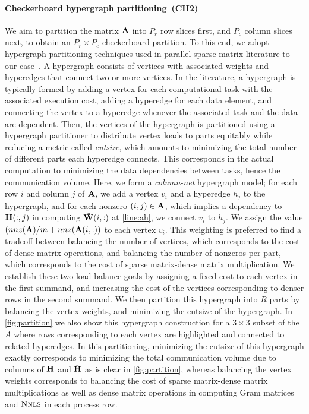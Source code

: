 \paragraph{Checkerboard hypergraph partitioning~(\textbf{CH2})} We aim to partition the matrix $\mathbf{A}$ into $P_r$ row slices first, and $P_c$ column slices next, to obtain an $P_r \times P_c$ checkerboard partition.
To this end, we adopt hypergraph partitioning techniques used in parallel sparse matrix literature to our case~\cite{caay:99}.
A hypergraph consists of vertices with associated weights and hyperedges that connect two or more vertices.
In the literature, a hypergraph is typically formed by adding a vertex for each computational task with the associated execution cost, adding a hyperedge for each data element, and connecting the vertex to a hyperedge whenever the associated task and the data are dependent.
Then, the vertices of the hypergraph is partitioned using a hypergraph partitioner to distribute vertex loads to parts equitably while reducing a metric called \emph{cutsize}, which amounts to minimizing the total number of different parts each hyperedge connects.
This corresponds in the actual computation to minimizing the data dependencies between tasks, hence the communication volume.
Here, we form a \emph{column-net} hypergraph model; for each row $i$ and column $j$ of  $\mathbf{A}$, we add a vertex $v_i$ and a hyperedge $h_j$ to the hypergraph, and for each nonzero $(i, j) \in \mathbf{A}$, which implies a dependency to $\mathbf{H}(:, j)$ in computing $\mathbf{\tilde{W}}(i, :)$ at \cref{line:ah}, we connect $v_i$ to $h_j$.
We assign the value $(nnz(\mathbf{A}) / m + nnz(\mathbf{A}(i, :))$ to each vertex $v_i$.
This weighting is preferred to find a tradeoff between balancing the number of vertices, which corresponds to the cost of dense matrix operations, and balancing the number of nonzeros per part, which corresponds to the cost of sparse matrix-dense matrix multiplication.
We establish these two load balance goals by assigning a fixed cost to each vertex in the first summand, and increasing the cost of the vertices corresponding to denser rows in the second summand.
We then partition this hypergraph into $R$ parts by balancing the vertex weights, and minimizing the cutsize of the hypergraph.
In \cref{fig:partition} we also show this hypergraph construction for a $3 \times 3$ subset of the $A$ where rows corresponding to each vertex are highlighted and connected to related hyperedges.
In this partitioning, minimizing the cutsize of this hypergraph exactly corresponds to minimizing the total communication volume due to columns of $\mathbf{H}$ and $\mathbf{\tilde{H}}$ as is clear in \cref{fig:partition}, whereas balancing the vertex weights corresponds to balancing the cost of sparse matrix-dense matrix multiplications as well as dense matrix operations in computing Gram matrices and $\textsc{Nnls}$ in each process row.

